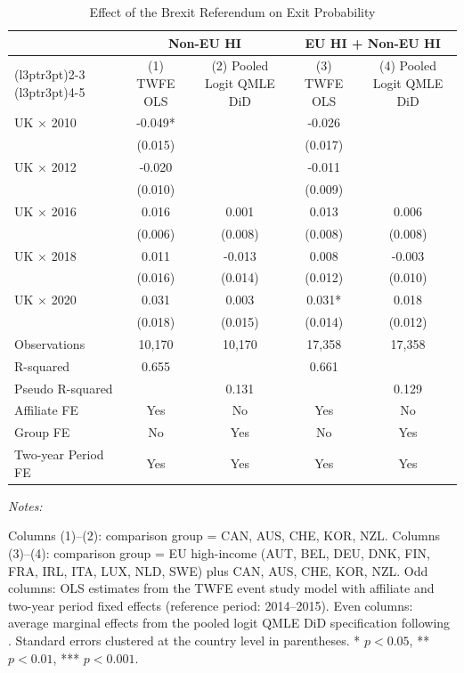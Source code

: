 \begin{table}[!ht]
\centering
\caption{\label{tab:noneu}Effect of the Brexit Referendum on Exit Probability}
\centering
\begin{threeparttable}
\begin{tabular}[t]{lcccc}
\toprule
\multicolumn{1}{c}{ } & \multicolumn{2}{c}{Non-EU HI} & \multicolumn{2}{c}{EU HI + Non-EU HI} \\
\cmidrule(l{3pt}r{3pt}){2-3} \cmidrule(l{3pt}r{3pt}){4-5}
 & (1) TWFE OLS & (2) Pooled Logit QMLE DiD & (3) TWFE OLS & (4) Pooled Logit QMLE DiD\\
\midrule
UK $\times$ 2010 & -0.049* &  & -0.026 & \\
 & (0.015) &  & (0.017) & \\
UK $\times$ 2012 & -0.020 &  & -0.011 & \\
 & (0.010) &  & (0.009) & \\
UK $\times$ 2016 & 0.016 & 0.001 & 0.013 & 0.006\\
 & (0.006) & (0.008) & (0.008) & (0.008)\\
UK $\times$ 2018 & 0.011 & -0.013 & 0.008 & -0.003\\
 & (0.016) & (0.014) & (0.012) & (0.010)\\
UK $\times$ 2020 & 0.031 & 0.003 & 0.031* & 0.018\\
 & (0.018) & (0.015) & (0.014) & (0.012)\\
Observations & 10,170 & 10,170 & 17,358 & 17,358\\
R-squared & 0.655 &  & 0.661 & \\
Pseudo R-squared &  & 0.131 &  & 0.129\\
Affiliate FE & Yes & No & Yes & No\\
Group FE & No & Yes & No & Yes\\
Two-year Period FE & Yes & Yes & Yes & Yes\\
\bottomrule
\end{tabular}
\begin{tablenotes}
\item \textit{Notes: } 
\item Columns (1)--(2): comparison group = CAN, AUS, CHE, KOR, NZL. Columns (3)--(4): comparison group = EU high-income (AUT, BEL, DEU, DNK, FIN, FRA, IRL, ITA, LUX, NLD, SWE) plus CAN, AUS, CHE, KOR, NZL. Odd columns: OLS estimates from the TWFE event study model with affiliate and two-year period fixed effects (reference period: 2014--2015). Even columns: average marginal effects from the pooled logit QMLE DiD specification following \citet{wooldridge2023simple}. Standard errors clustered at the country level in parentheses. * $p<0.05$, ** $p<0.01$, *** $p<0.001$.
\end{tablenotes}
\end{threeparttable}
\end{table}
